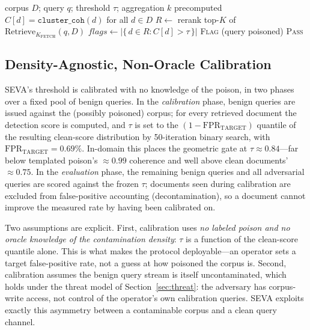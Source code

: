 \documentclass[conference]{IEEEtran}
\begin{document}
\begin{algorithm}[t]
\caption{SEVA detection (\texttt{cluster\_coh} hard gate)}
\label{alg:seva}
\begin{algorithmic}[1]
\REQUIRE corpus $D$; query $q$; threshold $\tau$; aggregation $k$
\REQUIRE precomputed $C[d]=\texttt{cluster\_coh}(d)$ for all $d\in D$
\STATE $R \leftarrow$ rerank top-$K$ of $\mathrm{Retrieve}_{K_{\mathrm{FETCH}}}(q, D)$
\STATE $\mathit{flags} \leftarrow \big|\{\, d \in R : C[d] > \tau \,\}\big|$
\RETURN \textsc{Flag} \quad (query poisoned)
\ELSE
\RETURN \textsc{Pass}
\ENDIF
\end{algorithmic}
\end{algorithm}

\subsection{Density-Agnostic, Non-Oracle Calibration}
SEVA's threshold is calibrated with no knowledge of the poison, in two phases over
a fixed pool of benign queries. In the \emph{calibration} phase, benign queries are
issued against the (possibly poisoned) corpus; for every retrieved document the
detection score is computed, and $\tau$ is set to the
$(1-\mathrm{FPR}_{\mathrm{TARGET}})$ quantile of the resulting clean-score
distribution by 50-iteration binary search, with
$\mathrm{FPR}_{\mathrm{TARGET}}=0.69\%$. In-domain this places the geometric gate at
$\tau\approx0.84$---far below templated poison's $\approx\!0.99$ coherence and well
above clean documents' $\approx\!0.75$. In the \emph{evaluation} phase, the
remaining benign queries and all adversarial queries are scored against the frozen
$\tau$; documents seen during calibration are excluded from false-positive
accounting (decontamination), so a document cannot improve the measured rate by
having been calibrated on.

Two assumptions are explicit. First, calibration uses \emph{no labeled poison and
no oracle knowledge of the contamination density}: $\tau$ is a function of the
clean-score quantile alone. This is what makes the protocol deployable---an operator
sets a target false-positive rate, not a guess at how poisoned the corpus is.
Second, calibration assumes the benign query stream is itself uncontaminated, which
holds under the threat model of Section~\ref{sec:threat}: the adversary has
corpus-write access, not control of the operator's own calibration queries. SEVA
exploits exactly this asymmetry between a contaminable corpus and a clean query
channel.
\end{document}
